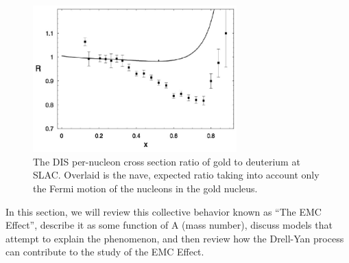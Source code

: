 \begin{figure}
	\centering
	\includegraphics[width=0.7\textwidth]{figures/background/emc-naive.eps}
	\caption{The DIS per-nucleon cross section ratio of gold to deuterium at SLAC\cite{Hen:2013oha}. Overlaid is the nave, expected ratio taking into account only the Fermi motion of the nucleons in the gold nucleus.}
	\label{fig:emc-one-naive}
\end{figure}

In this section, we will review this collective behavior known as ``The EMC Effect'', describe it as some function of A (mass number), discuss models that attempt to explain the phenomenon, and then review how the Drell-Yan process can contribute to the study of the EMC Effect.

